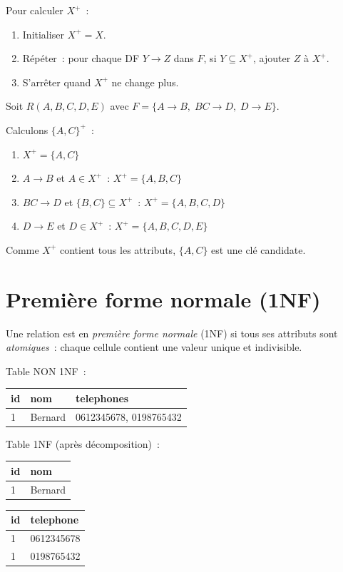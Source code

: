 \begin{proposition}
Pour calculer $X^+$~:
\begin{enumerate}
    \item Initialiser $X^+ = X$.
    \item R\'ep\'eter~: pour chaque DF $Y \to Z$ dans $F$, si $Y \subseteq X^+$,
          ajouter $Z$ \`a $X^+$.
    \item S'arr\^eter quand $X^+$ ne change plus.
\end{enumerate}
\end{proposition}

\begin{exemple}
Soit $R(A, B, C, D, E)$ avec $F = \{A \to B, \; BC \to D, \; D \to E\}$.

Calculons $\{A, C\}^+$~:
\begin{enumerate}
    \item $X^+ = \{A, C\}$
    \item $A \to B$ et $A \in X^+$~: $X^+ = \{A, B, C\}$
    \item $BC \to D$ et $\{B,C\} \subseteq X^+$~: $X^+ = \{A, B, C, D\}$
    \item $D \to E$ et $D \in X^+$~: $X^+ = \{A, B, C, D, E\}$
\end{enumerate}
Comme $X^+$ contient tous les attributs, $\{A, C\}$ est une cl\'e candidate.
\end{exemple}

\section{Premi\`ere forme normale (1NF)}

\begin{definition}[1NF]
Une relation est en \emph{premi\`ere forme normale} (1NF) si tous ses attributs
sont \emph{atomiques}~: chaque cellule contient une valeur unique et
indivisible.
\end{definition}

\begin{exemple}
Table NON 1NF~:
\begin{center}
\begin{tabular}{lll}
\toprule
id & nom & telephones \\
\midrule
1 & Bernard & 0612345678, 0198765432 \\
\bottomrule
\end{tabular}
\end{center}

Table 1NF (apr\`es d\'ecomposition)~:
\begin{center}
\begin{tabular}{ll}
\toprule
id & nom \\
\midrule
1 & Bernard \\
\bottomrule
\end{tabular}
\qquad
\begin{tabular}{ll}
\toprule
id & telephone \\
\midrule
1 & 0612345678 \\
1 & 0198765432 \\
\bottomrule
\end{tabular}
\end{center}
\end{exemple}

